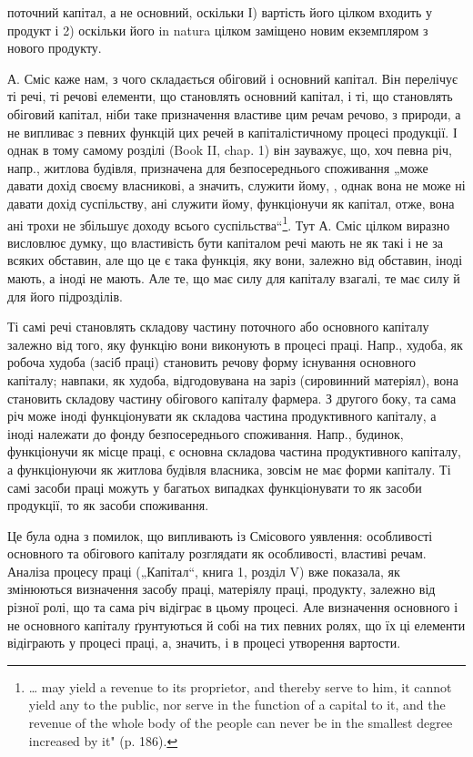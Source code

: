 \parcont{}  %
поточний капітал, а не основний, оскільки І) вартість його цілком входить
у продукт і 2) оскільки його in natura цілком заміщено новим екземпляром
з нового продукту.

А. Сміс каже нам, з чого складається обіговий і основний капітал.
Він перелічує ті речі, ті речові елементи, що становлять основний капітал,
і ті, що становлять обіговий капітал, ніби таке призначення властиве
цим речам речово, з природи, а не випливає з певних функцій
цих речей в капіталістичному процесі продукції. І однак в тому самому
розділі (Book II, chap. 1) він зауважує, що, хоч певна річ, напр., житлова
будівля, призначена для безпосереднього споживання „може давати
дохід своєму власникові, а значить, служити йому, , однак вона не може ні давати дохід суспільству, ані служити
йому, функціонучи як капітал, отже, вона ані трохи не збільшує доходу
всього суспільства“\footnote*{
\dots{} may yield a revenue to its proprietor, and thereby serve  to him, it cannot yield any to the public, nor serve in the function
of a capital to it, and the revenue of the whole body of the people can never be
in the smallest degree increased by it" (p. 186).
}. Тут А. Сміс цілком виразно висловлює думку, що
властивість бути капіталом речі мають не як такі і не за всяких обставин,
але що це є така функція, яку вони, залежно від обставин, іноді мають,
а іноді не мають. Але те, що має силу для капіталу взагалі, те має
силу й для його підрозділів.

Ті самі речі становлять складову частину поточного або основного
капіталу залежно від того, яку функцію вони виконують в процесі праці.
Напр., худоба, як робоча худоба (засіб праці) становить речову форму
існування основного капіталу; навпаки, як худоба, відгодовувана на
заріз (сировинний матеріял), вона становить складову частину обігового
капіталу фармера. З другого боку, та сама річ може іноді функціонувати
як складова частина продуктивного капіталу, а іноді належати до
фонду безпосереднього споживання. Напр., будинок, функціонучи як місце
праці, є основна складова частина продуктивного капіталу, а функціонуючи
як житлова будівля власника, зовсім не має форми капіталу.
Ті самі засоби праці можуть у багатьох випадках функціонувати то як
засоби продукції, то як засоби споживання.

Це була одна з помилок, що випливають із Смісового уявлення: особливості
основного та обігового капіталу розглядати як особливості,
властиві речам. Аналіза процесу праці („Капітал“, книга 1, розділ V)
вже показала, як змінюються визначення засобу праці, матеріялу праці,
продукту, залежно від різної ролі, що та сама річ відіграє в цьому
процесі. Але визначення основного і не основного капіталу ґрунтуються
й собі на тих певних ролях, що їх ці елементи відіграють у процесі праці,
а, значить, і в процесі утворення вартости.

